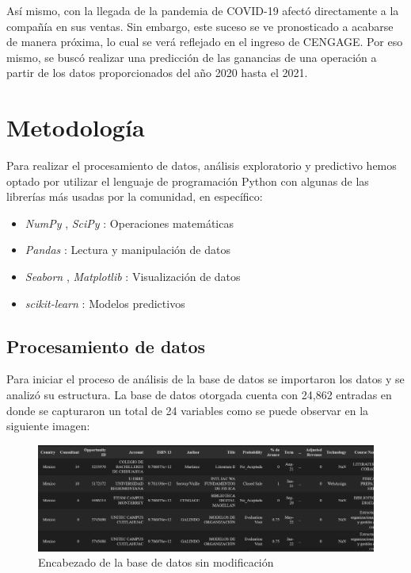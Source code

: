 \documentclass{article}
\begin{document}
        Así mismo, con la llegada de la pandemia de COVID-19 afectó directamente a la compañía en sus ventas. Sin embargo, este suceso se ve pronosticado a acabarse de manera próxima, lo cual se verá reflejado en el ingreso de CENGAGE. Por eso mismo, se buscó realizar una predicción de las ganancias de una operación a partir de los datos proporcionados del año 2020 hasta el 2021.

    \section{Metodología}

        Para realizar el procesamiento de datos, análisis exploratorio y predictivo hemos optado por utilizar el lenguaje de programación Python con algunas de las librerías más usadas por la comunidad, en específico:

        \begin{itemize}
            \item \emph{NumPy} \parencite{numpy}, \emph{SciPy} \parencite{2020SciPy-NMeth}: Operaciones matemáticas
            \item \emph{Pandas} \parencite{reback2020pandas}: Lectura y manipulación de datos
            \item \emph{Seaborn} \parencite{seaborn}, \emph{Matplotlib} \parencite{matplotlib}: Visualización de datos
            \item \emph{scikit-learn} \parencite{scikit-learn}: Modelos predictivos
        \end{itemize}

        \subsection{Procesamiento de datos}

        Para iniciar el proceso de análisis de la base de datos se importaron los datos y se analizó su estructura. La base de datos otorgada cuenta con 24,862 entradas en donde se capturaron un total de 24 variables como se puede observar en la siguiente imagen:

        \begin{figure}[h]
            \centering
            \includegraphics[width=\columnwidth]{img/raw_data.png}
            \caption{Encabezado de la base de datos sin modificación}
            \label{fig:table}
        \end{figure}
\end{document}
